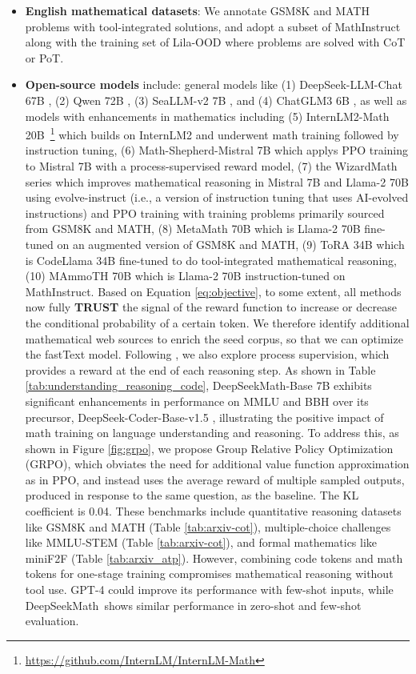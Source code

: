 \begin{itemize}[topsep=0pt]
    \item \textbf{English mathematical datasets}: We annotate GSM8K and MATH problems with tool-integrated solutions, and adopt a subset of MathInstruct \citep{MathInstruct} along with the training set of Lila-OOD \citep{lila} where problems are solved with CoT or PoT. \item \textbf{Open-source models} include: general models like (1) DeepSeek-LLM-Chat 67B \citep{deepseek-llm}, (2) Qwen 72B \citep{qwen}, (3) SeaLLM-v2 7B \citep{seallm}, and (4) ChatGLM3 6B \citep{chatglm3}, as well as models with enhancements in mathematics including (5) InternLM2-Math 20B~\footnote{\url{https://github.com/InternLM/InternLM-Math}} which builds on InternLM2 and underwent math training followed by instruction tuning, (6) Math-Shepherd-Mistral 7B which applys PPO training \citep{schulman2017proximal} to Mistral 7B \citep{mistral} with a process-supervised reward model, (7) the WizardMath series \citep{wizardmath} which improves mathematical reasoning in Mistral 7B and Llama-2 70B \citep{llama2} using evolve-instruct (i.e., a version of instruction tuning that uses AI-evolved instructions) and PPO training with training problems primarily sourced from GSM8K and MATH, (8) MetaMath 70B \citep{metamath} which is Llama-2 70B fine-tuned on an augmented version of GSM8K and MATH, (9) ToRA 34B \cite{tora} which is CodeLlama 34B fine-tuned to do tool-integrated mathematical reasoning, (10) MAmmoTH 70B \citep{MathInstruct} which is Llama-2 70B instruction-tuned on MathInstruct. Based on Equation \ref{eq:objective}, to some extent, all methods now fully \textbf{TRUST} the signal of the reward function to increase or decrease the conditional probability of a certain token. We therefore identify additional mathematical web sources to enrich the seed corpus, so that we can optimize the fastText model. Following \cite{wang2023math}, we also explore process supervision, which provides a reward at the end of each reasoning step. As shown in Table \ref{tab:understanding_reasoning_code}, DeepSeekMath-Base 7B exhibits significant enhancements in performance on MMLU and BBH over its precursor, DeepSeek-Coder-Base-v1.5 \citep{deepseek-coder}, illustrating the positive impact of math training on language understanding and reasoning. To address this, as shown in Figure \ref{fig:grpo}, we propose Group Relative Policy Optimization (GRPO), which obviates the need for additional value function approximation as in PPO, and instead uses the average reward of multiple sampled outputs, produced in response to the same question, as the baseline. The KL coefficient is 0.04. These benchmarks include quantitative reasoning datasets like GSM8K and MATH (Table \ref{tab:arxiv-cot}), multiple-choice challenges like MMLU-STEM (Table \ref{tab:arxiv-cot}), and formal mathematics like miniF2F (Table \ref{tab:arxiv_atp}). However, combining code tokens and math tokens for one-stage training compromises mathematical reasoning without tool use. GPT-4 could improve its performance with few-shot inputs, while DeepSeekMath~shows similar performance in zero-shot and few-shot evaluation. \end{itemize}

